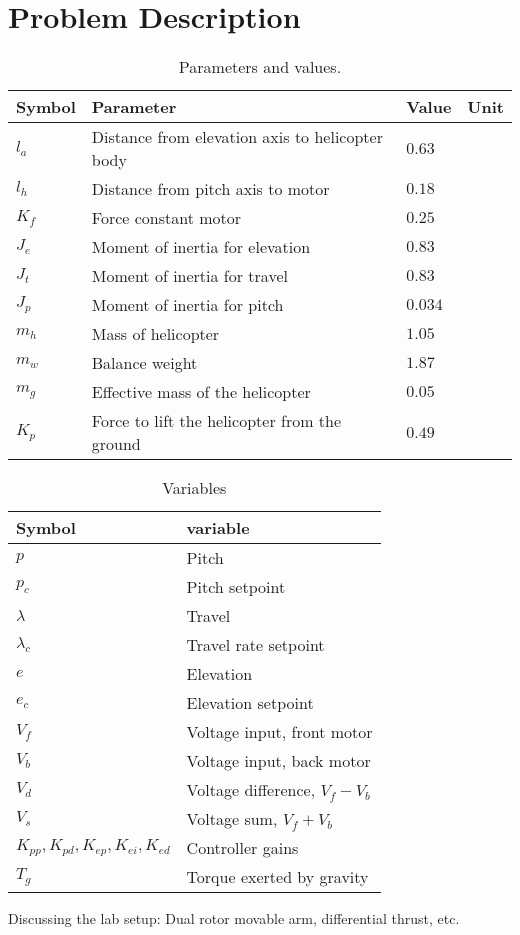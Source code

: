 \section{Problem Description}\label{sec:prob_descr}

\begin{table}[p]
	\centering
	\caption{Parameters and values.}
	\begin{tabular}{llll}
		\hline
		Symbol & Parameter & Value & Unit \\
		\hline
		$l_a$ & Distance from elevation axis to helicopter body & $0.63$ & \meter \\
		$l_h$ & Distance from pitch axis to motor & $0.18$ & \meter \\
		$K_f$ & Force constant motor & $0.25$ & \newton\per\volt \\
		$J_e$ & Moment of inertia for elevation & $0.83$ & \kilogram\usk\square\meter \\
		$J_t$ & Moment of inertia for travel & $0.83$ & \kilogram\usk\square\meter \\
		$J_p$ & Moment of inertia for pitch & $0.034$ & \kilogram\usk\square\meter \\
		$m_h$ & Mass of helicopter & $1.05$ & \kilogram \\
		$m_w$ & Balance weight & $1.87$ & \kilogram \\
		$m_g$ & Effective mass of the helicopter & $0.05$ & \kilogram \\
		$K_p$ & Force to lift the helicopter from the ground & $0.49$ & \newton \\
		\hline
	\end{tabular}
	\label{tab:parameters}
\end{table}

\begin{table}[p]
	\centering
	\caption{Variables}
	\begin{tabular}{ll}
		\hline
		Symbol & variable \\
		\hline
		$p$ & Pitch \\
		$p_c$ & Pitch setpoint \\
		$\lambda$ & Travel \\
		$\lambda_c$ & Travel rate setpoint \\
		$e$ & Elevation \\
		$e_c$ & Elevation setpoint \\
		$V_f$ & Voltage input, front motor \\
		$V_b$ & Voltage input, back motor \\
		$V_d$ & Voltage difference, $V_f - V_b$ \\
		$V_s$ & Voltage sum, $V_f + V_b$ \\
		$K_{pp}, K_{pd}, K_{ep}, K_{ei}, K_{ed}$ & Controller gains \\
		$T_g$ & Torque exerted by gravity \\
		\hline
	\end{tabular}
	\label{tab:variables}
\end{table}
Discussing the lab setup: Dual rotor movable arm, differential thrust, etc.


